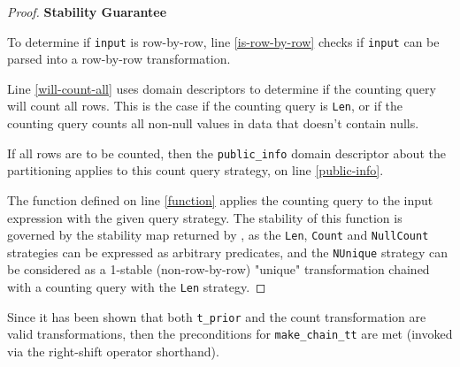 \documentclass{article}
\begin{document}
\begin{proof}
    \textbf{Stability Guarantee}

    To determine if \texttt{input} is row-by-row,
    line \ref{is-row-by-row} checks if \texttt{input} can be parsed into a row-by-row transformation.

    Line \ref{will-count-all} uses domain descriptors to determine if the counting query will count all rows.
    This is the case if the counting query is \texttt{Len}, 
    or if the counting query counts all non-null values in data that doesn't contain nulls.

    If all rows are to be counted, 
    then the \texttt{public\_info} domain descriptor about the partitioning applies to this count query strategy, 
    on line \ref{public-info}.

    The function defined on line \ref{function} applies the counting query to the input expression with the given query strategy.
    The stability of this function is governed by the stability map returned by ,
    as the \texttt{Len}, \texttt{Count} and \texttt{NullCount} strategies can be expressed as arbitrary predicates,
    and the \texttt{NUnique} strategy can be considered as a 1-stable (non-row-by-row) "unique" transformation chained with a counting query with the \texttt{Len} strategy.
\end{proof}

Since it has been shown that both \texttt{t\_prior} and the count transformation are valid transformations,
then the preconditions for \texttt{make\_chain\_tt} are met (invoked via the right-shift operator shorthand).
\end{document}
